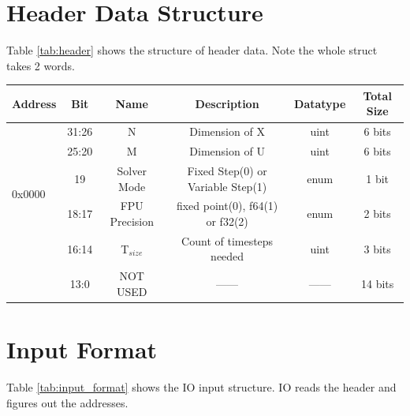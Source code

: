 \documentclass[12pt]{report}
\begin{document}
\section{Header Data Structure}
Table \ref{tab:header} shows the structure of header data. Note the whole struct takes 2 words.
\begin{center}
 \begin{tabular}{||l |c |c| c| c| c||} 
 \hline
 Address & Bit & Name & Description & Datatype & Total Size \\ [0.5ex] 
 \hline\hline
 \multirow{5}{*}{0x0000} & 31:26 & N & Dimension of X  & uint & 6 bits  \\ 
 \cline{2-6}
 & 25:20 & M & Dimension of U  & uint & 6 bits  \\ 
 \cline{2-6}
 & 19 & Solver Mode & Fixed Step(0) or Variable Step(1)  & enum & 1 bit \\ 
 \cline{2-6}
 & 18:17 & FPU Precision & fixed point(0), f64(1) or f32(2) & enum & 2 bits  \\ 
 \cline{2-6}
 & 16:14 & T$_{size}$ & Count of timesteps needed & uint & 3 bits \\ 
 \cline{2-6}
 & 13:0 & NOT USED &  ------ & ------ & 14 bits \\
 \hline
 
\end{tabular}
\end{center}

\section{Input Format}
Table \ref{tab:input_format} shows the IO input structure. IO reads the header and figures out the addresses.
\end{document}
